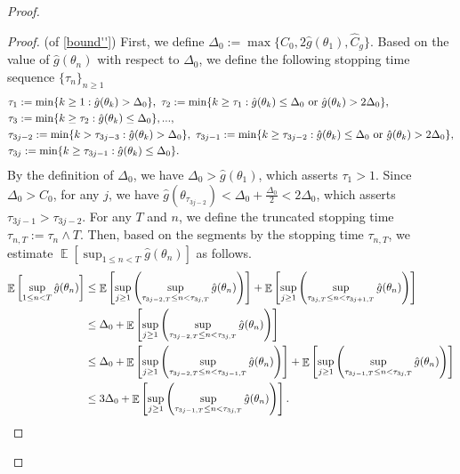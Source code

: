 \documentclass[standalone]{article}
\DeclareMathOperator{\Expect}{\mathbb{E}}
\begin{document}
\begin{proof}
\begin{proof}(of \cref{bound''}) 
First, we define \(\Delta_{0} := \max\{C_{0}, 2\hat{g}(\theta_{1}), \hat{C}_{g}\}\). Based on the value of \(\hat{g}(\theta_{n})\) with respect to \(\Delta_{0}\), we define the following stopping time sequence $\{\tau_{n}\}_{n\ge 1}$
\begin{align}\label{stopping_time'}
&\tau_{1}:=\min\{k\ge 1:\hat{g}(\theta_{k})>\Delta_0\},\ \tau_{2}:=\min\{k\ge \tau_{1}: \hat{g}(\theta_{k})\le  \Delta_0\ \text{or}\ \hat{g}(\theta_{k})>2\Delta_0\},\notag\\&\tau_{3}:=\min\{k\ge \tau_{2}:\hat{g}(\theta_{k})\le \Delta_0\},...,
\notag\\&\tau_{3j-2}:=\min\{k> \tau_{3j-3}:\hat{g}(\theta_{k})>\Delta_0\},\ \tau_{3j-1}:=\min\{k\ge \tau_{3j-2}:\hat{g}(\theta_{k})\le  \Delta_0\ \text{or}\ \hat{g}(\theta_{k})>2\Delta_0\},\notag\\&\tau_{3j}:=\min\{k\ge  \tau_{3j-1}:\hat{g}(\theta_{k})\le  \Delta_0\}.
\end{align}
By the definition of \(\Delta_{0}\), we have \(\Delta_{0} > \hat{g}(\theta_{1})\), which asserts \(\tau_{1} > 1\). Since \(\Delta_{0} > C_{0}\), for any \(j\), we have \(\hat{g}(\theta_{\tau_{3j-2}}) < \Delta_{0} + \frac{\Delta_{0}}{2} < 2\Delta_{0}\), which asserts \(\tau_{3j-1} > \tau_{3j-2}\). For any \(T\) and \(n\), we define the truncated stopping time \(\tau_{n,T} := \tau_{n} \wedge T\). Then, based on the segments by the stopping time $\tau_{n, T}$, we estimate \(\Expect\left[\sup_{1 \leq n < T} \hat{g}(\theta_{n})\right]\) as follows.
\begin{align}\label{RMSprop_7}
   \Expect\left[\sup_{1\le n<T}\hat{g}(\theta_{n})\right]&\le \Expect\left[\sup_{j\ge 1}\left(\sup_{\tau_{3j-2,T}\le n<\tau_{3j,T}}\hat{g}(\theta_{n})\right)\right] +\Expect\left[\sup_{j\ge 1}\left(\sup_{\tau_{3j,T}\le n<\tau_{3j+1,T}}\hat{g}(\theta_{n})\right)\right]\notag\\&\le \Delta_{0}+ \Expect\left[\sup_{j\ge 1}\left(\sup_{\tau_{3j-2,T}\le n<\tau_{3j,T}}\hat{g}(\theta_{n})\right)\right]\notag\\&\le \Delta_{0}+  \Expect\left[\sup_{j\ge 1}\left(\sup_{\tau_{3j-2,T}\le n<\tau_{3j-1,T}}\hat{g}(\theta_{n})\right)\right]+ \Expect\left[\sup_{j\ge 1}\left(\sup_{\tau_{3j-1,T}\le n<\tau_{3j,T}}\hat{g}(\theta_{n})\right)\right]\notag\\&\le 3\Delta_{0}+ \Expect\left[\sup_{j\ge 1}\left(\sup_{\tau_{3j-1,T}\le n<\tau_{3j,T}}\hat{g}(\theta_{n})\right)\right].
\end{align}

\end{proof}
\end{proof}
\end{document}
